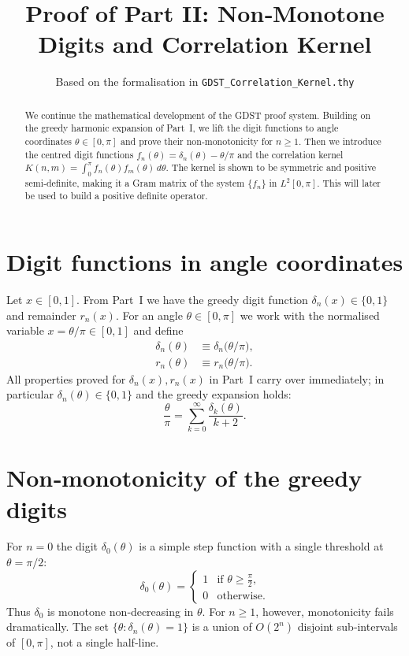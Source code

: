 \documentclass[11pt,a4paper]{article}
\title{Proof of Part II: Non‑Monotone Digits and Correlation Kernel}
\author{Based on the formalisation in \texttt{GDST\_Correlation\_Kernel.thy}}
\date{}
\theoremstyle{definition}
\theoremstyle{remark}
\begin{document}
\maketitle

\begin{abstract}
We continue the mathematical development of the GDST proof system.
Building on the greedy harmonic expansion of Part~I, we lift the digit functions to angle coordinates \(\theta\in[0,\pi]\) and prove their non‑monotonicity for \(n\ge 1\).
Then we introduce the centred digit functions \(f_n(\theta)=\delta_n(\theta)-\theta/\pi\) and the correlation kernel \(K(n,m)=\int_0^\pi f_n(\theta)f_m(\theta)\,d\theta\).
The kernel is shown to be symmetric and positive semi‑definite, making it a Gram matrix of the system \(\{f_n\}\) in \(L^2[0,\pi]\).
This will later be used to build a positive definite operator.
\end{abstract}

\section{Digit functions in angle coordinates}

Let \(x\in[0,1]\). From Part~I we have the greedy digit function \(\delta_n(x)\in\{0,1\}\) and remainder \(r_n(x)\).
For an angle \(\theta\in[0,\pi]\) we work with the normalised variable \(x=\theta/\pi\in[0,1]\) and define
\begin{align}
\delta_n(\theta) &\equiv \delta_n\!\bigl(\theta/\pi\bigr), \label{eq:delta_theta}\\
r_n(\theta) &\equiv r_n\!\bigl(\theta/\pi\bigr). \label{eq:rem_theta}
\end{align}
All properties proved for \(\delta_n(x), r_n(x)\) in Part~I carry over immediately; in particular \(\delta_n(\theta)\in\{0,1\}\) and the greedy expansion holds:
\[
\frac{\theta}{\pi} = \sum_{k=0}^{\infty} \frac{\delta_k(\theta)}{k+2}.
\]

\section{Non‑monotonicity of the greedy digits}

For \(n=0\) the digit \(\delta_0(\theta)\) is a simple step function with a single threshold at \(\theta=\pi/2\):
\[
\delta_0(\theta) = \begin{cases}
1 &\text{if } \theta \ge \frac{\pi}{2},\\[2pt]
0 &\text{otherwise}.
\end{cases}
\]
Thus \(\delta_0\) is monotone non‑decreasing in \(\theta\).
For \(n\ge 1\), however, monotonicity fails dramatically. The set \(\{\theta : \delta_n(\theta)=1\}\) is a union of \(O(2^n)\) disjoint sub‑intervals of \([0,\pi]\), not a single half‑line.
\end{document}
